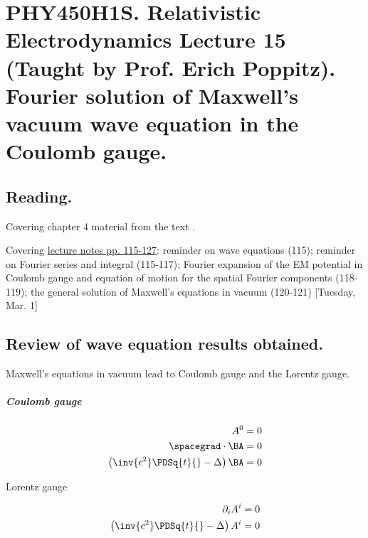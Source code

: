 
%

\chapter{PHY450H1S.  Relativistic Electrodynamics Lecture 15 (Taught by Prof. Erich Poppitz).  Fourier solution of Maxwell's vacuum wave equation in the Coulomb gauge.}
\label{chap:relativisticElectrodynamicsL15}
{}
\date{Mar 1, 2011}

\beginArtNoToc

\section{Reading.}

Covering chapter 4 material from the text \cite{landau1980classical}.

Covering \href{http://www.physics.utoronto.ca/~poppitz/e-poppitz/PHY450_files/RelEMpp115-127.pdf}{lecture notes pp. 115-127}: reminder on wave equations (115); reminder on Fourier series and integral (115-117); Fourier expansion of the EM potential in Coulomb gauge and equation of motion for the spatial Fourier components (118-119); the general solution of Maxwell's equations in vacuum (120-121) [Tuesday, Mar. 1]

\section{Review of wave equation results obtained.}

Maxwell's equations in vacuum lead to Coulomb gauge and the Lorentz gauge.

\paragraph{Coulomb gauge}

\begin{align}\label{eqn:relativisticElectrodynamicsL15:10}
A^0 &= 0 \\
\spacegrad \cdot \BA &= 0 \\
\left( \inv{c^2} \PDSq{t}{} - \Delta \right) \BA &= 0
\end{align}

Lorentz gauge

\begin{align}\label{eqn:relativisticElectrodynamicsL15:30}
\partial_i A^i &= 0 \\
\left( \inv{c^2} \PDSq{t}{} - \Delta \right) A^i &= 0
\end{align}

